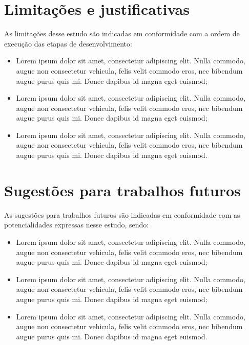 \documentclass[brazil,hardcopy,openany,a5paper]{ufscthesis}
\begin{document}
\section{Limitações e justificativas}

As limitações desse estudo são indicadas em conformidade com a ordem de execução das etapas de desenvolvimento:

\begin{itemize}
	\item Lorem ipsum dolor sit amet, consectetur adipiscing elit. Nulla commodo, augue non consectetur vehicula, felis velit commodo eros, nec bibendum augue purus quis mi. Donec dapibus id magna eget euismod;
	
	\item Lorem ipsum dolor sit amet, consectetur adipiscing elit. Nulla commodo, augue non consectetur vehicula, felis velit commodo eros, nec bibendum augue purus quis mi. Donec dapibus id magna eget euismod;
	
	\item Lorem ipsum dolor sit amet, consectetur adipiscing elit. Nulla commodo, augue non consectetur vehicula, felis velit commodo eros, nec bibendum augue purus quis mi. Donec dapibus id magna eget euismod.
	
\end{itemize}

\section{Sugestões para trabalhos futuros}

As sugestões para trabalhos futuros são indicadas em conformidade com as potencialidades expressas nesse estudo, sendo:

\begin{itemize}
	\item Lorem ipsum dolor sit amet, consectetur adipiscing elit. Nulla commodo, augue non consectetur vehicula, felis velit commodo eros, nec bibendum augue purus quis mi. Donec dapibus id magna eget euismod;

	\item Lorem ipsum dolor sit amet, consectetur adipiscing elit. Nulla commodo, augue non consectetur vehicula, felis velit commodo eros, nec bibendum augue purus quis mi. Donec dapibus id magna eget euismod;

	\item Lorem ipsum dolor sit amet, consectetur adipiscing elit. Nulla commodo, augue non consectetur vehicula, felis velit commodo eros, nec bibendum augue purus quis mi. Donec dapibus id magna eget euismod.
	
\end{itemize}
\end{document}
